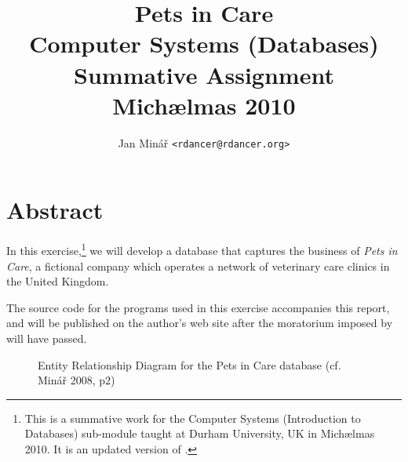 \documentclass[10pt]{article}
\author{Jan Minář {\tt <rdancer@rdancer.org>}}
\title{Pets in Care\\Computer Systems (Databases)\\Summative Assignment\\Michælmas 2010}
\begin{document}


\maketitle



\section{Abstract}
\thispagestyle{fancy}

In this exercise,\footnote{This is a summative work for the Computer Systems (Introduction to Databases) sub-module taught at Durham University, UK in Michælmas 2010.  It is an updated version of \cite{minarcsys}.} we will develop a database that captures the business of {\em Pets in Care}, a fictional company which operates a network of veterinary care clinics in the United Kingdom.

The source code for the programs used in this exercise accompanies this report, and will be published on the author's web site after the moratorium imposed by \cite{plagiarism} will have passed.

\begin{figure}

    \noindent

    \caption{
	Entity Relationship Diagram for the Pets in Care database (cf. Minář 2008, p2)
    }
    \label{flowchart}
\end{figure}
\end{document}
